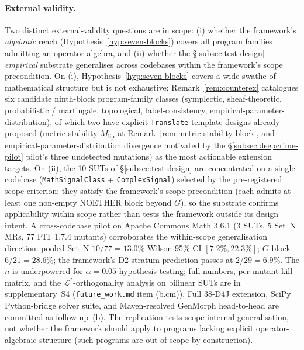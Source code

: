 \documentclass[acmsmall, screen]{acmart}
\begin{document}
\paragraph{External validity.} Two distinct external-validity questions are in scope: (i) whether the framework's \emph{algebraic} reach (Hypothesis~\ref{hyp:seven-blocks}) covers all program families admitting an operator algebra, and (ii) whether the \S\ref{subsec:test-design} \emph{empirical} substrate generalises across codebases within the framework's scope precondition. On (i), Hypothesis~\ref{hyp:seven-blocks} covers a wide swathe of mathematical structure but is not exhaustive; Remark~\ref{rem:counterex} catalogues six candidate ninth-block program-family classes (symplectic, sheaf-theoretic, probabilistic / martingale, topological, label-consistency, empirical-parameter-distribution), of which two have explicit \texttt{Translate}-template designs already proposed (metric-stability $M_{\mathrm{lip}}$ at Remark~\ref{rem:metric-stability-block}, and empirical-parameter-distribution divergence motivated by the \S\ref{subsec:deepcrime-pilot} pilot's three undetected mutations) as the most actionable extension targets. On (ii), the 10 SUTs of \S\ref{subsec:test-design} are concentrated on a single codebase (\texttt{MathSignalClass} + \texttt{ComplexSignal}) selected by the pre-registered scope criterion; they satisfy the framework's scope precondition (each admits at least one non-empty NOETHER block beyond $G$), so the substrate confirms applicability within scope rather than tests the framework outside its design intent. A cross-codebase pilot on Apache Commons Math 3.6.1 (3 SUTs, 5 Set~N MRs, 77 PIT 1.7.4 mutants) corroborates the within-scope generalisation direction: pooled Set~N $10/77 = 13.0\%$ Wilson 95\% CI $[7.2\%, 22.3\%]$; $G$-block $6/21 = 28.6\%$; the framework's D2 stratum prediction passes at $2/29 = 6.9\%$. The $n$ is underpowered for $\alpha = 0.05$ hypothesis testing; full numbers, per-mutant kill matrix, and the $\mathcal{L}^{*}$-orthogonality analysis on bilinear SUTs are in supplementary~S4 (\texttt{future\_work.md} item (b.cm)). Full $38$-D4J extension, SciPy Python-bridge solver suite, and Maven-resolved GenMorph head-to-head are committed as follow-up~(b). The replication tests scope-internal generalisation, not whether the framework should apply to programs lacking explicit operator-algebraic structure (such programs are out of scope by construction).
\end{document}
